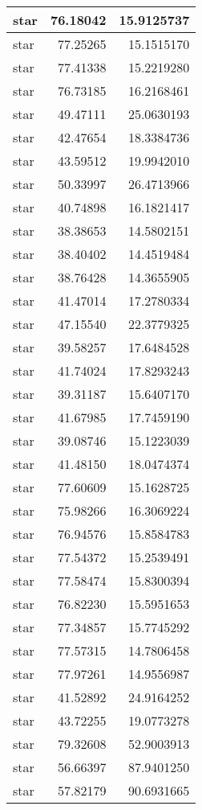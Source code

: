 \documentclass[
]{book}
\theoremstyle{definition}
\theoremstyle{definition}
\theoremstyle{definition}
\theoremstyle{definition}
\theoremstyle{remark}
\begin{document}
\begin{tabular}{l|r|r}
\hline
star & 76.18042 & 15.9125737\\
\hline
star & 77.25265 & 15.1515170\\
\hline
star & 77.41338 & 15.2219280\\
\hline
star & 76.73185 & 16.2168461\\
\hline
star & 49.47111 & 25.0630193\\
\hline
star & 42.47654 & 18.3384736\\
\hline
star & 43.59512 & 19.9942010\\
\hline
star & 50.33997 & 26.4713966\\
\hline
star & 40.74898 & 16.1821417\\
\hline
star & 38.38653 & 14.5802151\\
\hline
star & 38.40402 & 14.4519484\\
\hline
star & 38.76428 & 14.3655905\\
\hline
star & 41.47014 & 17.2780334\\
\hline
star & 47.15540 & 22.3779325\\
\hline
star & 39.58257 & 17.6484528\\
\hline
star & 41.74024 & 17.8293243\\
\hline
star & 39.31187 & 15.6407170\\
\hline
star & 41.67985 & 17.7459190\\
\hline
star & 39.08746 & 15.1223039\\
\hline
star & 41.48150 & 18.0474374\\
\hline
star & 77.60609 & 15.1628725\\
\hline
star & 75.98266 & 16.3069224\\
\hline
star & 76.94576 & 15.8584783\\
\hline
star & 77.54372 & 15.2539491\\
\hline
star & 77.58474 & 15.8300394\\
\hline
star & 76.82230 & 15.5951653\\
\hline
star & 77.34857 & 15.7745292\\
\hline
star & 77.57315 & 14.7806458\\
\hline
star & 77.97261 & 14.9556987\\
\hline
star & 41.52892 & 24.9164252\\
\hline
star & 43.72255 & 19.0773278\\
\hline
star & 79.32608 & 52.9003913\\
\hline
star & 56.66397 & 87.9401250\\
\hline
star & 57.82179 & 90.6931665\\

\end{tabular}
\end{document}
